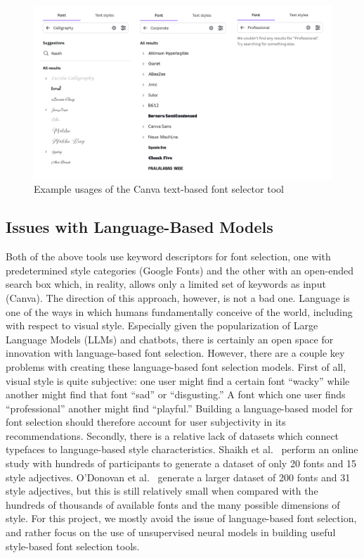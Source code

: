 \begin{figure}
    \centering
    \includegraphics[width=.95\textwidth]{images/canva-font-selector.png}
    \caption{Example usages of the Canva text-based font selector tool}
    \label{fig:canva-font-selector}
\end{figure}

\subsection{Issues with Language-Based Models}

Both of the above tools use keyword descriptors for font selection, one with predetermined style categories (Google Fonts) and the other with an open-ended search box which, in reality, allows only a limited set of keywords as input (Canva). The direction of this approach, however, is not a bad one. Language is one of the ways in which humans fundamentally conceive of the world, including with respect to visual style. Especially given the popularization of Large Language Models (LLMs) and chatbots, there is certainly an open space for innovation with language-based font selection. However, there are a couple key problems with creating these language-based font selection models. First of all, visual style is quite subjective: one user might find a certain font ``wacky'' while another might find that font ``sad'' or ``disgusting.'' A font which one user finds ``professional'' another might find ``playful.'' Building a language-based model for font selection should therefore account for user subjectivity in its recommendations. Secondly, there is a relative lack of datasets which connect typefaces to language-based style characteristics. Shaikh et al.\ \cite{shaikh2006} perform an online study with hundreds of participants to generate a dataset of only 20 fonts and 15 style adjectives. O'Donovan et al.\ \cite{odonovan2014} generate a larger dataset of 200 fonts and 31 style adjectives, but this is still relatively small when compared with the hundreds of thousands of available fonts and the many possible dimensions of style. For this project, we mostly avoid the issue of language-based font selection, and rather focus on the use of unsupervised neural models in building useful style-based font selection tools.

